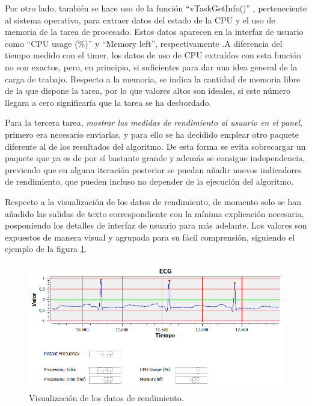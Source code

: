         
        Por otro lado,  también se hace uso de la función ``vTaskGetInfo()'' \cite{FreeRTOS}, perteneciente al sistema operativo, para extraer datos del estado de la CPU y el uso de memoria de la tarea de procesado. Estos datos aparecen en la interfaz de usuario como ``CPU usage (\%)'' y ``Memory left'', respectivamente .A diferencia del tiempo medido con el timer, los datos de uso de CPU extraídos con esta función no son exactos, pero, en principio, si suficientes para dar una idea general de la carga de trabajo. Respecto a la memoria, se indica la cantidad de memoria libre de la que dispone la tarea, por lo que valores altos son ideales, si este número llegara a cero significaría que la tarea se ha desbordado. 
        
        Para la tercera tarea, \textit{mostrar las medidas de rendimiento al usuario en el panel}, primero era necesario enviarlas, y para ello se ha decidido emplear otro paquete diferente al de los resultados del algoritmo. De esta forma se evita sobrecargar un paquete que ya es de por sí bastante grande y además se consigue independencia, previendo que en alguna iteración posterior se puedan añadir nuevos indicadores de rendimiento, que pueden incluso no depender de la ejecución del algoritmo.
        
        Respecto a la visualización de los datos de rendimiento, de momento solo se han añadido las salidas de texto correspondiente con la mínima explicación necesaria, posponiendo los detalles de interfaz de usuario para más adelante. Los valores son expuestos de manera visual y agrupada para su fácil comprensión, siguiendo el ejemplo de la figura \ref{fig:performance}.
        
        \begin{figure}[H]
                \centering
                        \includegraphics[width = 0.9 \linewidth]{figuras/Performance.PNG}
                \caption{Visualización de los datos de rendimiento.}
                \label{fig:performance}
        \end{figure}
        
